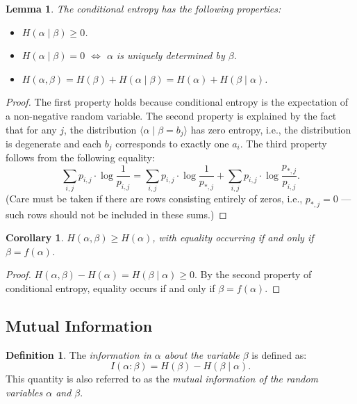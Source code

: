 \documentclass[12pt,sans]{article}
\theoremstyle{definition}
\newtheorem{definition}{Definition}[section]
\theoremstyle{plain}
\newtheorem{lemma}{Lemma}[section]
\newtheorem{corollary}{Corollary}[section]
\theoremstyle{remark}
\begin{document}
\begin{lemma}
    The conditional entropy has the following properties:
    \begin{itemize}
        \item \(H(\alpha\mid\beta) \ge 0\).
        \item \(H(\alpha\mid\beta) = 0\) \(\iff\) \(\alpha\) is uniquely determined by \(\beta\).
        \item \(H(\alpha,\beta) = H(\beta) + H(\alpha\mid\beta) = H(\alpha) + H(\beta\mid\alpha)\).
    \end{itemize}
\end{lemma}

\begin{proof}
    The first property holds because conditional entropy is the expectation of a non-negative random variable. The second property is explained by the fact that for any \(j\), the distribution \(\langle \alpha \mid \beta = b_j \rangle\) has zero entropy, i.e., the distribution is degenerate and each \(b_j\) corresponds to exactly one \(a_i\). The third property follows from the following equality:
    \[
    \sum_{i,j} p_{i,j} \cdot \log\frac{1}{p_{i,j}} =
    \sum_{i,j} p_{i,j} \cdot \log\frac{1}{p_{*,j}} +
    \sum_{i,j} p_{i,j} \cdot \log\frac{p_{*,j}}{p_{i,j}}.
    \]
    (Care must be taken if there are rows consisting entirely of zeros, i.e., \(p_{*,j} = 0\) — such rows should not be included in these sums.)
\end{proof}

\begin{corollary}
    \(H(\alpha,\beta) \ge H(\alpha)\), with equality occurring if and only if \(\beta = f(\alpha)\).
\end{corollary}

\begin{proof}
    \(H(\alpha,\beta) - H(\alpha) = H(\beta\mid\alpha) \ge 0\). By the second property of conditional entropy, equality occurs if and only if \(\beta = f(\alpha)\).
\end{proof}

\subsection{Mutual Information}

\begin{definition}
    The \emph{information in \(\alpha\) about the variable \(\beta\)} is defined as:
    \[
    I(\alpha:\beta) = H(\beta) - H(\beta\mid\alpha).
    \]
    This quantity is also referred to as the \emph{mutual information of the random variables \(\alpha\) and \(\beta\)}.
\end{definition}
\end{document}
